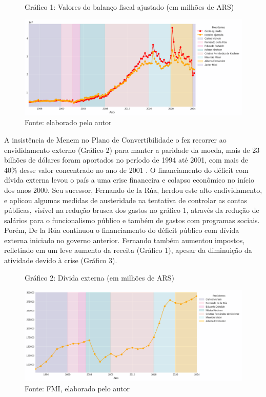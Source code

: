 \documentclass[a4paper, 12pt, openany, oneside, brazil]{abntex2}
\begin{document}
\begin{figure}[h!]
	\caption*{Gráfico 1: Valores do balanço fiscal ajustado (em milhões de ARS)}
	\includegraphics[width=\textwidth]{dados/valores_fiscais_ca}
	\caption*{Fonte: elaborado pelo autor}
\end{figure}

A insistência de Menem no Plano de Convertibilidade o fez recorrer ao envididamento externo (Gráfico 2) para manter a paridade da moeda, mais de 23 bilhões de dólares foram aportados no período de 1994 até 2001, com mais de 40\% desse valor concentrado no ano de 2001 \cite{Damill2006}. O financiamento do déficit com dívida externa levou o país a uma crise financeira e colapso econômico no início dos anos 2000. Seu sucessor, Fernando de la Rúa, herdou este alto endividamento, e aplicou algumas medidas de austeridade na tentativa de controlar as contas públicas, visível na redução brusca dos gastos no gráfico 1, através da redução de salários para o funcionalismo público e também de gastos com programas sociais. Porém, De la Rúa continuou o financiamento do déficit público com dívida externa iniciado no governo anterior. Fernando também aumentou impostos, refletindo em um leve aumento da receita (Gráfico 1), apesar da diminuição da atividade devido à crise (Gráfico 3).

\begin{figure}[h!]
	\caption*{Gráfico 2: Dívida externa (em milhões de ARS)}
	\includegraphics[width=\textwidth]{dados/divida_externa}
	\caption*{Fonte: FMI, elaborado pelo autor}
\end{figure}
\end{document}
